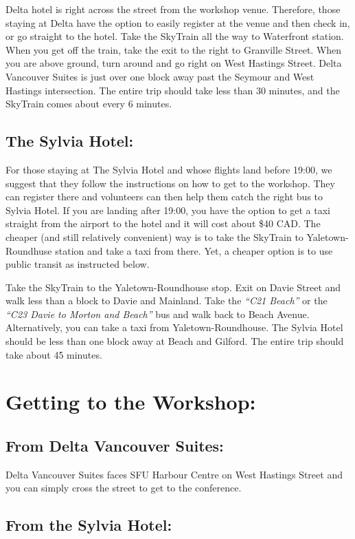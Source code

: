 \documentclass[letterpaper,12pt]{article}
\newcommand{\bus}[1]{\textit{``#1''}}
\begin{document}
Delta hotel is right across the street from the workshop venue. Therefore, those staying at Delta have the option to easily register at the venue and then check in, or go straight to the hotel.
Take the SkyTrain all the way to Waterfront station. When you get off the train, take the exit to the right to Granville Street. When you are above ground, turn around and go right on West Hastings Street. Delta Vancouver Suites is just over one block away past the Seymour and West Hastings intersection. The entire trip should take less than 30 minutes, and the SkyTrain comes about every 6 minutes.

\subsection*{The Sylvia Hotel:}

For those staying at The Sylvia Hotel and whose flights land before 19:00, we suggest that they follow the instructions on how to get to the workshop. They can register there and volunteers can then help them catch the right bus to Sylvia Hotel.
If you are landing after 19:00, you have the option to get a taxi straight from the airport to the hotel and it will cost about \$40 CAD. The cheaper (and still relatively convenient) way is to take the SkyTrain to Yaletown-Roundhuse station and take a taxi from there. Yet, a cheaper option is to use public transit as instructed below.

Take the SkyTrain to the Yaletown-Roundhouse stop. Exit on Davie Street and walk less than a block to Davie and Mainland. Take the \bus{C21 Beach} or the \bus{C23 Davie to Morton and Beach} bus and walk back to Beach Avenue. Alternatively, you can take a taxi from Yaletown-Roundhouse. The Sylvia Hotel should be less than one block away at Beach and Gilford. The entire trip should take about 45 minutes.


\section*{Getting to the Workshop:}

\subsection*{From Delta Vancouver Suites:}

Delta Vancouver Suites faces SFU Harbour Centre on West Hastings Street and you can simply cross the street to get to the conference.

\subsection*{From the Sylvia Hotel:}
\end{document}
